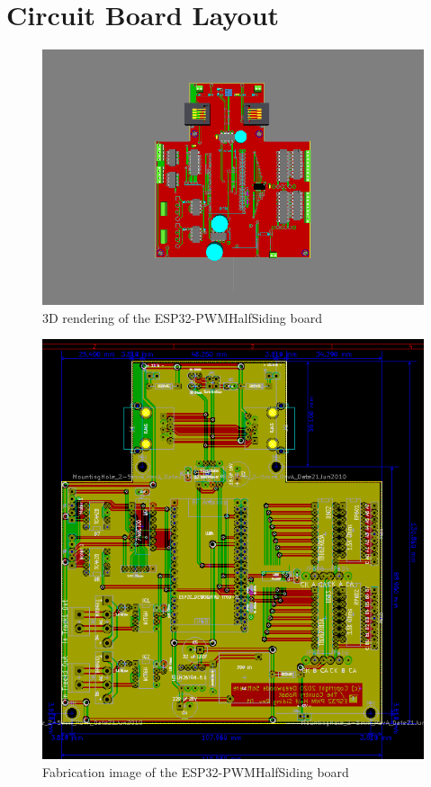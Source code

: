 \section{Circuit Board Layout}

\begin{figure}[hbpt]\begin{centering}%
\includegraphics[width=5in]{ESP32-PWMHalfSiding3DTop.png}
\caption{3D rendering of the ESP32-PWMHalfSiding board}
\end{centering}\end{figure}
\begin{figure}[hbpt]\begin{centering}%
\includegraphics[width=5in]{ESP32-PWMHalfSiding.png}
\caption{Fabrication image of the ESP32-PWMHalfSiding board}
\end{centering}\end{figure}


